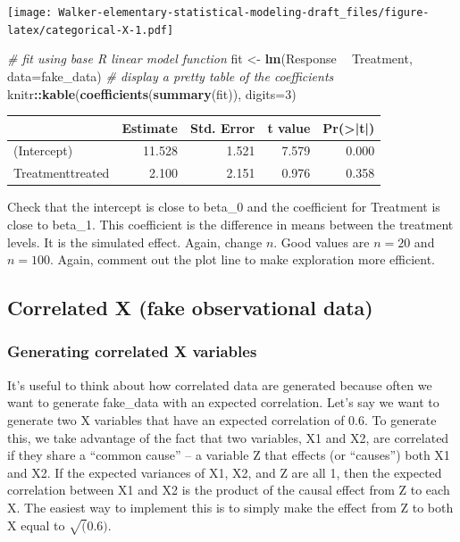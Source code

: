 \documentclass[]{book}
\newenvironment{Shaded}{\begin{snugshade}}{\end{snugshade}}
\newcommand{\KeywordTok}[1]{\textcolor[rgb]{0.13,0.29,0.53}{\textbf{#1}}}
\newcommand{\DataTypeTok}[1]{\textcolor[rgb]{0.13,0.29,0.53}{#1}}
\newcommand{\DecValTok}[1]{\textcolor[rgb]{0.00,0.00,0.81}{#1}}
\newcommand{\StringTok}[1]{\textcolor[rgb]{0.31,0.60,0.02}{#1}}
\newcommand{\CommentTok}[1]{\textcolor[rgb]{0.56,0.35,0.01}{\textit{#1}}}
\newcommand{\OperatorTok}[1]{\textcolor[rgb]{0.81,0.36,0.00}{\textbf{#1}}}
\newcommand{\NormalTok}[1]{#1}
\begin{document}
\texttt{[image: Walker-elementary-statistical-modeling-draft\_files/figure-latex/categorical-X-1.pdf]}

\begin{Shaded}
\begin{Highlighting}[]
\CommentTok{# fit using base R linear model function}
\NormalTok{fit <-}\StringTok{ }\KeywordTok{lm}\NormalTok{(Response }\OperatorTok{~}\StringTok{ }\NormalTok{Treatment, }\DataTypeTok{data=}\NormalTok{fake_data)}
\CommentTok{# display a pretty table of the coefficients}
\NormalTok{knitr}\OperatorTok{::}\KeywordTok{kable}\NormalTok{(}\KeywordTok{coefficients}\NormalTok{(}\KeywordTok{summary}\NormalTok{(fit)), }\DataTypeTok{digits=}\DecValTok{3}\NormalTok{)}
\end{Highlighting}
\end{Shaded}

\begin{tabular}{l|r|r|r|r}
\hline
  & Estimate & Std. Error & t value & Pr(>|t|)\\
\hline
(Intercept) & 11.528 & 1.521 & 7.579 & 0.000\\
\hline
Treatmenttreated & 2.100 & 2.151 & 0.976 & 0.358\\
\hline
\end{tabular}

Check that the intercept is close to beta\_0 and the coefficient for
Treatment is close to beta\_1. This coefficient is the difference in
means between the treatment levels. It is the simulated effect. Again,
change \(n\). Good values are \(n=20\) and \(n=100\). Again, comment out
the plot line to make exploration more efficient.

\subsection{Correlated X (fake observational
data)}\label{correlated-x-fake-observational-data}

\subsubsection{Generating correlated X
variables}\label{generating-correlated-x-variables}

It's useful to think about how correlated data are generated because
often we want to generate fake\_data with an expected correlation. Let's
say we want to generate two X variables that have an expected
correlation of 0.6. To generate this, we take advantage of the fact that
two variables, X1 and X2, are correlated if they share a ``common
cause'' -- a variable Z that effects (or ``causes'') both X1 and X2. If
the expected variances of X1, X2, and Z are all 1, then the expected
correlation between X1 and X2 is the product of the causal effect from Z
to each X. The easiest way to implement this is to simply make the
effect from Z to both X equal to \(\sqrt(0.6)\).
\end{document}
